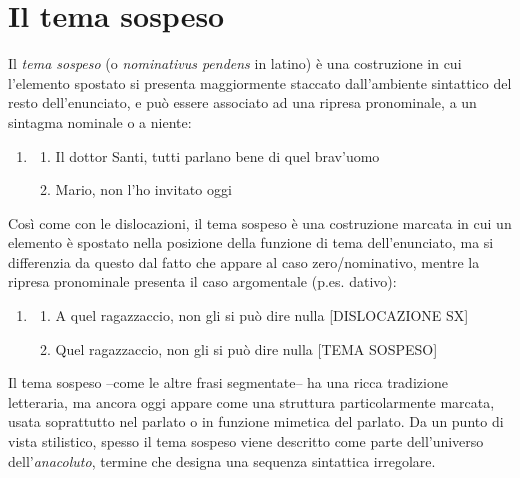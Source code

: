 \documentclass[
  a4paper,
  twoside,
  11pt,
  chapterprefix=false,
  bibliography=totocnumbered,
  listof=flat]{scrbook}
\providecommand{\tightlist}{%
  \setlength{\itemsep}{0pt}\setlength{\parskip}{0pt}}
\begin{document}
\hypertarget{il-tema-sospeso}{%
\section{Il tema sospeso}\label{il-tema-sospeso}}

Il \emph{tema sospeso} (o \emph{nominativus pendens} in latino) è una costruzione in cui l'elemento spostato si presenta maggiormente staccato dall'ambiente sintattico del resto dell'enunciato, e può essere associato ad una ripresa pronominale, a un sintagma nominale o a niente:

\begin{enumerate}
\def\labelenumi{(\arabic{enumi})}
\setcounter{enumi}{174}
\item
  \begin{enumerate}
  \def\labelenumii{\alph{enumii}.}
  \tightlist
  \item
    Il dottor Santi, tutti parlano bene di quel brav'uomo
  \item
    Mario, non l'ho invitato oggi
  \end{enumerate}
\end{enumerate}

Così come con le dislocazioni, il tema sospeso è una costruzione marcata in cui un elemento è spostato nella posizione della funzione di tema dell'enunciato, ma si differenzia da questo dal fatto che appare al caso zero/nominativo, mentre la ripresa pronominale presenta il caso argomentale (p.es. dativo):

\begin{enumerate}
\def\labelenumi{(\arabic{enumi})}
\setcounter{enumi}{175}
\item
  \begin{enumerate}
  \def\labelenumii{\alph{enumii}.}
  \tightlist
  \item
    A quel ragazzaccio, non gli si può dire nulla {[}DISLOCAZIONE SX{]}
  \item
    Quel ragazzaccio, non gli si può dire nulla {[}TEMA SOSPESO{]}
  \end{enumerate}
\end{enumerate}

Il tema sospeso --come le altre frasi segmentate-- ha una ricca tradizione letteraria, ma ancora oggi appare come una struttura particolarmente marcata, usata soprattutto nel parlato o in funzione mimetica del parlato.
Da un punto di vista stilistico, spesso il tema sospeso viene descritto come parte dell'universo dell'\emph{anacoluto}, termine che designa una sequenza sintattica irregolare.
\end{document}
